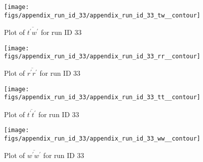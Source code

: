 \begin{figure}[H]
\centering
\texttt{[image: figs/appendix\_run\_id\_33/appendix\_run\_id\_33\_tw\_\_contour]}
\caption{Plot of $\overline{t^\prime w^\prime}$ for run ID 33}
\label{fig:appendix_run_id_33_tw__contour}
\end{figure}


\begin{figure}[H]
\centering
\texttt{[image: figs/appendix\_run\_id\_33/appendix\_run\_id\_33\_rr\_\_contour]}
\caption{Plot of $\overline{r^\prime r^\prime}$ for run ID 33}
\label{fig:appendix_run_id_33_rr__contour}
\end{figure}


\begin{figure}[H]
\centering
\texttt{[image: figs/appendix\_run\_id\_33/appendix\_run\_id\_33\_tt\_\_contour]}
\caption{Plot of $\overline{t^\prime t^\prime}$ for run ID 33}
\label{fig:appendix_run_id_33_tt__contour}
\end{figure}


\begin{figure}[H]
\centering
\texttt{[image: figs/appendix\_run\_id\_33/appendix\_run\_id\_33\_ww\_\_contour]}
\caption{Plot of $\overline{w^\prime w^\prime}$ for run ID 33}
\label{fig:appendix_run_id_33_ww__contour}
\end{figure}


